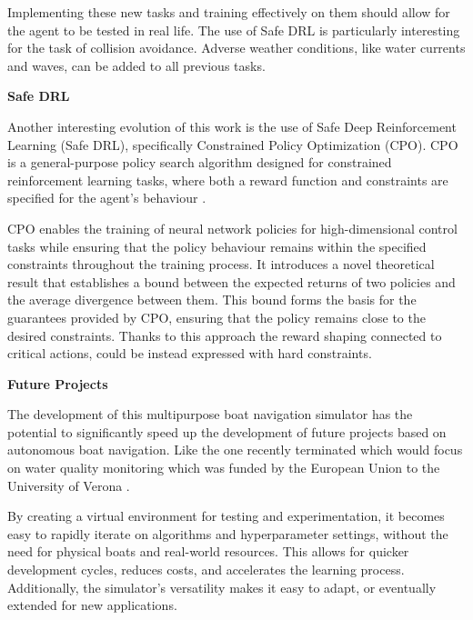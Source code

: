 \begin{textblock}
Implementing these new tasks and training effectively on them should allow for the agent to be tested in real life. The use of Safe DRL is particularly interesting for the task of collision avoidance.
Adverse weather conditions, like water currents and waves, can be added to all previous tasks.
\end{textblock}



\begin{textblock}
{\bf Safe DRL }

Another interesting evolution of this work is the use of Safe Deep Reinforcement Learning (Safe DRL), specifically Constrained Policy Optimization (CPO). CPO is a general-purpose policy search algorithm designed for constrained reinforcement learning tasks, where both a reward function and constraints are specified for the agent's behaviour \cite{cpo2017}.

CPO enables the training of neural network policies for high-dimensional control tasks while ensuring that the policy behaviour remains within the specified constraints throughout the training process. It introduces a novel theoretical result that establishes a bound between the expected returns of two policies and the average divergence between them. This bound forms the basis for the guarantees provided by CPO, ensuring that the policy remains close to the desired constraints. Thanks to this approach the reward shaping connected to critical actions, could be instead expressed with hard constraints.
\end{textblock}



\begin{textblock}
{\bf Future Projects }

The development of this multipurpose boat navigation simulator has the potential to significantly speed up the development of future projects based on autonomous boat navigation. Like the one recently terminated which would focus on water quality monitoring which was funded by the European Union to the University of Verona \cite{intcatch}\cite{intcatcheuro}. 

By creating a virtual environment for testing and experimentation, it becomes easy to rapidly iterate on algorithms and hyperparameter settings, without the need for physical boats and real-world resources. This allows for quicker development cycles, reduces costs, and accelerates the learning process. Additionally, the simulator's versatility makes it easy to adapt, or eventually extended for new applications.
\end{textblock}


